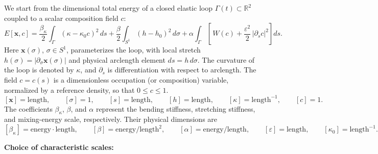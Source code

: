 \documentclass[
aip,
jcp,
reprint, 
floatfix
]{revtex4-1}
\begin{document}
We start from the dimensional total energy of a closed elastic loop $\Gamma(t)\subset\mathbb{R}^2$ coupled to a scalar composition field $c$:
\begin{equation}
E[\mathbf{x},c]
=
\frac{\beta_{\kappa}}{2}\int_\Gamma (\kappa - \kappa_0 c)^2\,ds
+\frac{\beta}{2}\int_{S^1} (h-h_0)^2\,d\sigma
+\alpha \int_\Gamma \left[\, W(c) + \frac{\varepsilon^2}{2}\,|\partial_s c|^2 \right] ds .
\label{eq:dim_energy}
\end{equation}
Here $\mathbf{x}(\sigma)$, $\sigma\in S^1$, parameterizes the loop, with local stretch
$h(\sigma)=|\partial_\sigma \mathbf{x}(\sigma)|$ and physical arclength element $ds=h\,d\sigma$.
The curvature of the loop is denoted by $\kappa$, and $\partial_s$ is differentiation with respect to arclength. The field $c=c(s)$ is a dimensionless occupation (or composition) variable, normalized by a reference density, so that $0\le c\le 1$. 
\[
[\mathbf{x}] = \mathrm{length},\qquad
[\sigma]=1,\qquad
[s]=\mathrm{length},\qquad
[h]=\mathrm{length},\qquad
[\kappa]=\mathrm{length}^{-1},\qquad
[c]=1.
\]
The coefficients $\beta_{\kappa}$, $\beta$, and $\alpha$ represent the bending stiffness, stretching
stiffness, and mixing-energy scale, respectively. Their physical dimensions are
\[
[\beta_{\kappa}]=\mathrm{energy}\cdot \mathrm{length},\qquad
[\beta]=\mathrm{energy}/\mathrm{length}^2,\qquad
[\alpha]=\mathrm{energy}/\mathrm{length},\qquad
[\varepsilon]=\mathrm{length},\qquad
[\kappa_0]=\mathrm{length}^{-1}.
\]

\textbf{Choice of characteristic scales:}
\end{document}
